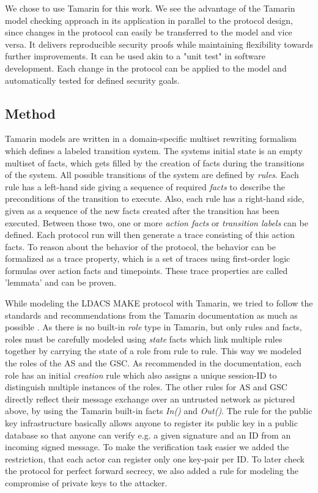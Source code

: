 We chose to use Tamarin for this work. We see the advantage of the Tamarin model checking approach in its application in parallel to the protocol design, since changes in the protocol can easily be transferred to the model and vice versa. It delivers reproducible security proofs while maintaining flexibility towards further improvements. It can be used akin to a "unit test" in software development. Each change in the protocol can be applied to the model and automatically tested for defined security goals.

\subsection{Method}

Tamarin models are written in a domain-specific multiset rewriting formalism which defines a labeled transition system. The systems initial state is an empty multiset of facts, which gets filled by the creation of facts during the transitions of the system. All possible transitions of the system are defined by  \textit{rules}. Each rule has a left-hand side giving a sequence of required \textit{facts} to describe the preconditions of the transition to execute. Also, each rule has a right-hand side, given as a sequence of the new facts created after the transition has been executed. Between those two, one or more \textit{action facts} or \textit{transition labels} can be defined. Each protocol run will then generate a trace consisting of this action facts. To reason about the behavior of the protocol, the behavior can be formalized as a trace property, which is a set of traces using first-order logic formulas over action facts and timepoints. These trace properties are called 'lemmata' and can be proven.

While modeling the LDACS MAKE protocol with Tamarin, we tried to follow the standards and recommendations from the Tamarin documentation as much as possible \cite{tamarinDoc2020}. As there is no built-in \textit{role} type in Tamarin, but only rules and facts, roles must be carefully modeled using \textit{state} facts which link multiple rules together by carrying the state of a role from rule to rule.  This way we modeled the roles of the \ac{AS} and the \ac{GSC}. As recommended in the documentation, each role has an initial \textit{creation} rule which also assigns a unique session-ID to distinguish multiple instances of the roles. The other rules for AS and GSC directly reflect their message exchange over an untrusted network as pictured above, by using the Tamarin built-in facts  \textit{In()} and \textit{Out()}. The rule for the public key infrastructure basically allows anyone to register its public key in a public database so that anyone can verify e.g. a given signature and an ID from an incoming signed message. To make the verification task easier we added the restriction, that each actor can register only one key-pair per ID. To later check the protocol for perfect forward secrecy, we also added a rule for modeling the compromise of private keys to the attacker. 

